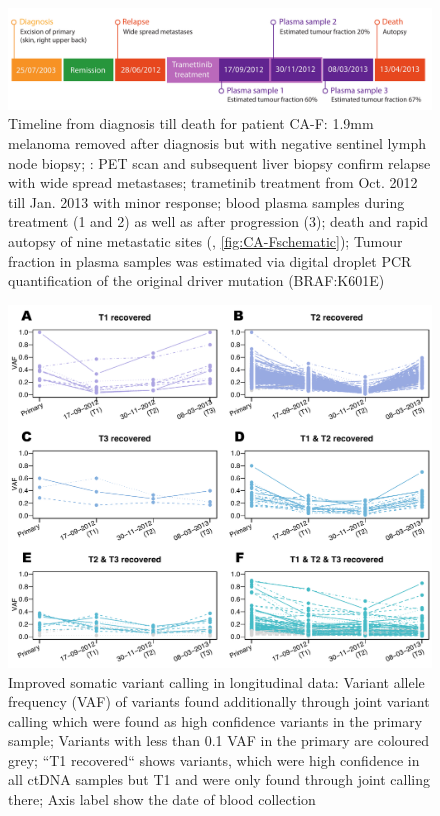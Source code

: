 \begin{figure}[ht]
\centering
\includegraphics[width=.99\linewidth]{Figures/jointVariantCalling/CA-F_timeline.pdf}
\caption[Timeline from diagnosis till death for patient CA-F]{Timeline from diagnosis till death for patient CA-F: 1.9mm melanoma removed after diagnosis  but with negative sentinel lymph node biopsy; : PET scan and subsequent liver biopsy confirm relapse with wide spread metastases; trametinib treatment from Oct. 2012 till Jan. 2013 with minor response; blood plasma samples during treatment (1 and 2) as well as after progression (3); death and rapid autopsy of nine metastatic sites (, \protect\autoref{fig:CA-Fschematic}); Tumour fraction in plasma samples was estimated via digital droplet PCR quantification of the original driver mutation (BRAF:K601E)}\label{fig:CA-Ftimeline}
\end{figure}

\begin{figure}[ht]
\centering
\includegraphics[width=.99\linewidth]{Figures/jointVariantCalling/longitudinalCA9ctDNAVafs.pdf}
\caption[Improved somatic variant calling in longitudinal data]{Improved somatic variant calling in longitudinal data: Variant allele frequency (VAF) of variants found additionally through joint variant calling which were found as high confidence variants in the primary sample; Variants with less than 0.1 VAF in the primary are coloured grey; ``T1 recovered`` shows variants, which were high confidence in all ctDNA samples but T1 and were only found through joint calling there; Axis label show the date of blood collection }\label{fig:longitudinalVAFsctDNA}
\end{figure}

